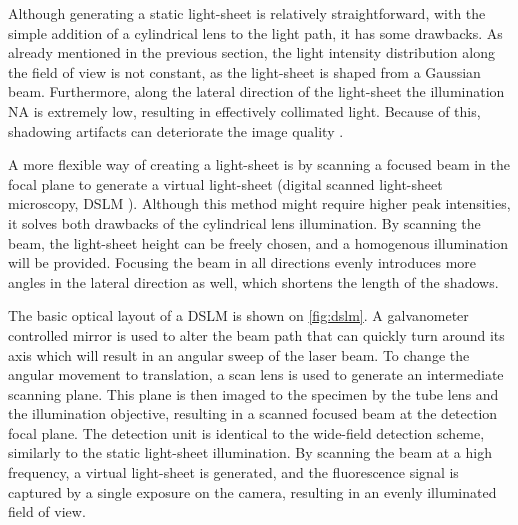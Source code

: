     Although generating a static light-sheet is relatively straightforward, with the simple addition of a cylindrical lens to the light path, it has some drawbacks. As already mentioned in the previous section, the light intensity distribution along the field of view is not constant, as the light-sheet is shaped from a Gaussian beam. Furthermore, along the lateral direction of the light-sheet the illumination NA is extremely low, resulting in effectively collimated light. Because of this, shadowing artifacts can deteriorate the image quality \cite{huisken_even_2007}.

    A more flexible way of creating a light-sheet is by scanning a focused beam in the focal plane to generate a virtual light-sheet (digital scanned light-sheet microscopy, DSLM \cite{keller_reconstruction_2008}). Although this method might require higher peak intensities, it solves both drawbacks of the cylindrical lens illumination. By scanning the beam, the light-sheet height can be freely chosen, and a homogenous illumination will be provided. Focusing the beam in all directions evenly introduces more angles in the lateral direction as well, which shortens the length of the shadows.
    
    The basic optical layout of a DSLM is shown on \autoref{fig:dslm}. A galvanometer controlled mirror is used to alter the beam path that can quickly turn around its axis which will result in an angular sweep of the laser beam. To change the angular movement to translation, a scan lens is used to generate an intermediate scanning plane. This plane is then imaged to the specimen by the tube lens and the illumination objective, resulting in a scanned focused beam at the detection focal plane. The detection unit is identical to the wide-field detection scheme, similarly to the static light-sheet illumination. By scanning the beam at a high frequency, a virtual light-sheet is generated, and the fluorescence signal is captured by a single exposure on the camera, resulting in an evenly illuminated field of view.

  



  



